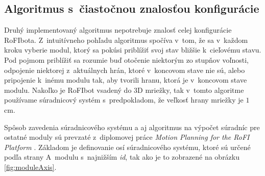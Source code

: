 \documentclass[
  printed, %
  oneside, %
  notable,   %
  nolof,     %
  nolot,     %
]{fithesis3}
\begin{document}
\subsection{Algoritmus s~čiastočnou znalosťou konfigurácie}
\label{sec:distributedAlgo}
Druhý implementovaný algoritmus nepotrebuje znalosť celej konfigurácie RoFIbota. Z~intuitívneho pohľadu algoritmus spočíva v~tom, že sa v~každom kroku vyberie modul, ktorý sa pokúsi priblížiť svoj stav bližšie k~cieľovému stavu. Pod pojmom priblížiť sa rozumie buď otočenie niektorým zo stupňov voľnosti, odpojenie niektorej z~aktuálnych hrán, ktoré v~koncovom stave nie sú, alebo pripojenie k~inému modulu tak, aby tvorili hranu, ktorá je v~koncovom stave modulu. Nakoľko je RoFIbot vsadený do 3D mriežky, tak v~tomto algoritme používame súradnicový systém s~predpokladom, že veľkosť hrany mriežky je $1$\,cm. 

Spôsob zavedenia súradnicového systému a aj algoritmus na výpočet súradníc pre ostatné moduly sú prevzaté z~diplomovej práce \textit{Motion Planning for the RoFI Platform} \cite{vozarovaMasterThesis}. Základom je definovanie osí súradnicového systému, ktoré sú určené podľa strany A~modulu s~najnižším \textit{id}, tak ako je to zobrazené na obrázku \ref{fig:moduleAxis}. 
\end{document}
